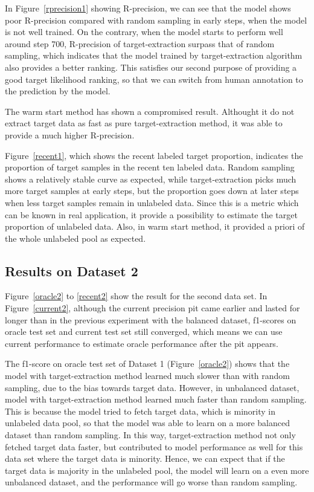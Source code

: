 \documentclass{deime}
\begin{document}
In Figure~\ref{rprecision1} showing R-precision, we can see that the
model shows poor R-precision compared with random sampling in early
steps, when the model is not well trained.  On the contrary, when the
model starts to perform well around step 700, R-precision of
target-extraction surpass that of random sampling, which indicates
that the model trained by target-extraction algorithm also provides a
better ranking. This satisfies our second purpose of providing a good
target likelihood ranking, so that we can switch from human annotation
to the prediction by the model.

The warm start method has shown a compromised result. Althought it do
not extract target data as fast as pure target-extraction method, it
was able to provide a much higher R-precision.

Figure~\ref{recent1}, which shows the recent labeled target
proportion, indicates the proportion of target samples in the recent
ten labeled data. Random sampling shows a relatively stable curve as
expected, while target-extraction picks much more target samples at
early steps, but the proportion goes down at later steps when less
target samples remain in unlabeled data. Since this is a metric which
can be known in real application, it provide a possibility to estimate
the target proportion of unlabeled data. Also, in warm start method,
it provided a priori of the whole unlabeled pool as expected.

\subsection{Results on Dataset 2}

Figure~\ref{oracle2} to \ref{recent2} show the result for the second
data set.  In Figure~\ref{current2}, although the current precision
pit came earlier and lasted for longer than in the previous experiment
with the balanced dataset, f1-scores on oracle test set and current
test set still converged, which means we can use current performance
to estimate oracle performance after the pit appears.

The f1-score on oracle test set of Dataset 1 (Figure~\ref{oracle2})
shows that the model with target-extraction method learned much slower
than with random sampling, due to the bias towards target
data. However, in unbalanced dataset, model with target-extraction
method learned much faster than random sampling. This is because the
model tried to fetch target data, which is minority in unlabeled data
pool, so that the model was able to learn on a more balanced dataset
than random sampling. In this way, target-extraction method not only
fetched target data faster, but contributed to model performance as
well for this data set where the target data is minority. Hence, we
can expect that if the target data is majority in the unlabeled pool,
the model will learn on a even more unbalanced dataset, and the
performance will go worse than random sampling.
\end{document}
